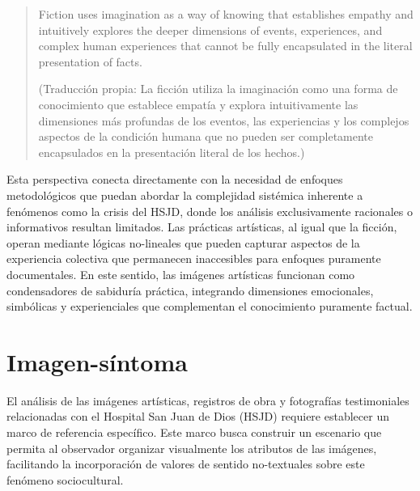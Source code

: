 \begin{quote}
    Fiction uses imagination as a way of knowing that establishes empathy and intuitively explores the deeper dimensions of events, experiences, and complex human experiences that cannot be fully encapsulated in the literal presentation of facts. \parencite[p. 30]{Leavy2018}
    
    \footnotesize
    (Traducción propia: La ficción utiliza la imaginación como una forma de conocimiento que establece empatía y explora intuitivamente las dimensiones más profundas de los eventos, las experiencias y los complejos aspectos de la condición humana que no pueden ser completamente encapsulados en la presentación literal de los hechos.)
    \normalsize
\end{quote}

Esta perspectiva conecta directamente con la necesidad de enfoques metodológicos que puedan abordar la complejidad sistémica inherente a fenómenos como la crisis del HSJD, donde los análisis exclusivamente racionales o informativos resultan limitados. Las prácticas artísticas, al igual que la ficción, operan mediante lógicas no-lineales que pueden capturar aspectos de la experiencia colectiva que permanecen inaccesibles para enfoques puramente documentales. En este sentido, las imágenes artísticas funcionan como condensadores de sabiduría práctica, integrando dimensiones emocionales, simbólicas y experienciales que complementan el conocimiento puramente factual.

\section{Imagen-síntoma}

El análisis de las imágenes artísticas, registros de obra y fotografías testimoniales relacionadas con el Hospital San Juan de Dios (HSJD) requiere establecer un marco de referencia específico. Este marco busca construir un escenario que permita al observador organizar visualmente los atributos de las imágenes, facilitando la incorporación de valores de sentido no-textuales sobre este fenómeno sociocultural.

